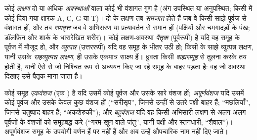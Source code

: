 \begin{definition}\label{def:b1:classifying-biodiversity:characters}
कोई \emph{लक्षण} दो या अधिक \emph{अवस्थाओं} वाला कोई भी वंशागत गुण है
(अंग उपस्थित या अनुपस्थित; किसी  में कोई दिया गया क्षारक A, C, G
या T)। दो  के लक्षण तब \emph{समजात} होते हैं जब वे किसी साझे पूर्वज
से वंशागत हों, और तब \emph{समवृत्त} जब वे अभिसरण या प्रत्यावर्तन से समान
हों (पक्षियों और चमगादड़ों के पंख; डॉलफ़िन और शार्क के धारारेखित शरीर)।
कोई लक्षण-अवस्था \emph{पैतृक} (पूर्वरूपी) है यदि वह समूह के पूर्वज में
मौजूद हो, और \emph{व्युत्पन्न} (उत्तररूपी) यदि वह समूह के भीतर उठी हो;
किसी  के साझे व्युत्पन्न लक्षण, यानी उसके \emph{सहव्युत्पन्न लक्षण},
ही उसके एकमात्र साक्ष्य हैं। ध्रुवता किसी \emph{बाह्यसमूह} से तुलना करके
तय होती है, यानी ऐसे  से जो निश्चित रूप से अध्ययन किए जा रहे समूह के
बाहर पड़ता है: वह जो अवस्था दिखाए उसे पैतृक माना जाता है।
\end{definition}

\begin{definition}\label{def:b1:classifying-biodiversity:monophyly}
कोई समूह \emph{एकवंशज} (एक ) है यदि उसमें कोई पूर्वज और उसके सारे
वंशज हों; \emph{अपूर्णवंशज} यदि उसमें कोई पूर्वज और उसके केवल कुछ वंशज
हों (``सरीसृप'', जिनसे उन्हीं से उतरे पक्षी बाहर हैं; ``मछलियाँ'', जिनसे
चतुष्पाद बाहर हैं; ``अकशेरुकी''); और \emph{बहुवंशज} यदि वह किसी अभिसारी
लक्षण से अलग-अलग पूर्वजों के वंशजों को समूहबद्ध करे (``गरम-खून वाले
जंतु'', यानी पक्षी और स्तनधारी; ``शैवाल'')। अपूर्णवंशज समूह  के उपयोगी वर्णन हैं पर  नहीं हैं और अब उन्हें औपचारिक नाम
नहीं दिए जाते।
\end{definition}

